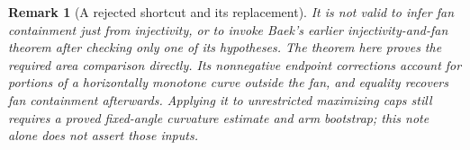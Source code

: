 \documentclass[11pt]{article}
\newtheorem{remark}{Remark}
\begin{document}
\begin{remark}[A rejected shortcut and its replacement]
It is not valid to infer fan containment just from injectivity, or to invoke Baek's earlier injectivity-and-fan theorem after checking only one of its hypotheses. The theorem here proves the required area comparison directly. Its nonnegative endpoint corrections account for portions of a horizontally monotone curve outside the fan, and equality recovers fan containment afterwards. Applying it to unrestricted maximizing caps still requires a proved fixed-angle curvature estimate and arm bootstrap; this note alone does not assert those inputs.
\end{remark}
\end{document}
